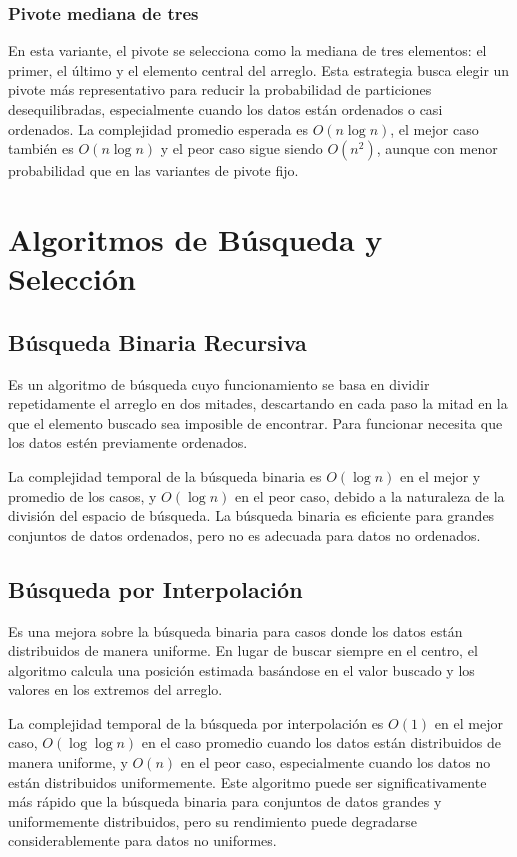 \subsubsection{Pivote mediana de tres}
En esta variante, el pivote se selecciona como la mediana de tres elementos: el primer, el último y el elemento central del arreglo. Esta estrategia busca elegir un pivote más representativo para reducir la probabilidad de particiones desequilibradas, especialmente cuando los datos están ordenados o casi ordenados. La complejidad promedio esperada es \(O(n \log n)\), el mejor caso también es \(O(n \log n)\) y el peor caso sigue siendo \(O(n^2)\), aunque con menor probabilidad que en las variantes de pivote fijo.

\section{Algoritmos de Búsqueda y Selección}

\subsection{Búsqueda Binaria Recursiva}
Es un algoritmo de búsqueda cuyo funcionamiento se basa en dividir repetidamente el arreglo en dos mitades, descartando en cada paso la mitad en la que el elemento buscado sea imposible de encontrar. Para funcionar necesita que los datos estén previamente ordenados.

La complejidad temporal de la búsqueda binaria es \(O(\log n)\) en el mejor y promedio de los casos, y \(O(\log n)\) en el peor caso, debido a la naturaleza de la división del espacio de búsqueda. La búsqueda binaria es eficiente para grandes conjuntos de datos ordenados, pero no es adecuada para datos no ordenados.

\subsection{Búsqueda por Interpolación}
Es una mejora sobre la búsqueda binaria para casos donde los datos están distribuidos de manera uniforme. En lugar de buscar siempre en el centro, el algoritmo calcula una posición estimada basándose en el valor buscado y los valores en los extremos del arreglo.

La complejidad temporal de la búsqueda por interpolación es \(O(1)\) en el mejor caso, \(O(\log \log n)\) en el caso promedio cuando los datos están distribuidos de manera uniforme, y \(O(n)\) en el peor caso, especialmente cuando los datos no están distribuidos uniformemente. Este algoritmo puede ser significativamente más rápido que la búsqueda binaria para conjuntos de datos grandes y uniformemente distribuidos, pero su rendimiento puede degradarse considerablemente para datos no uniformes.

